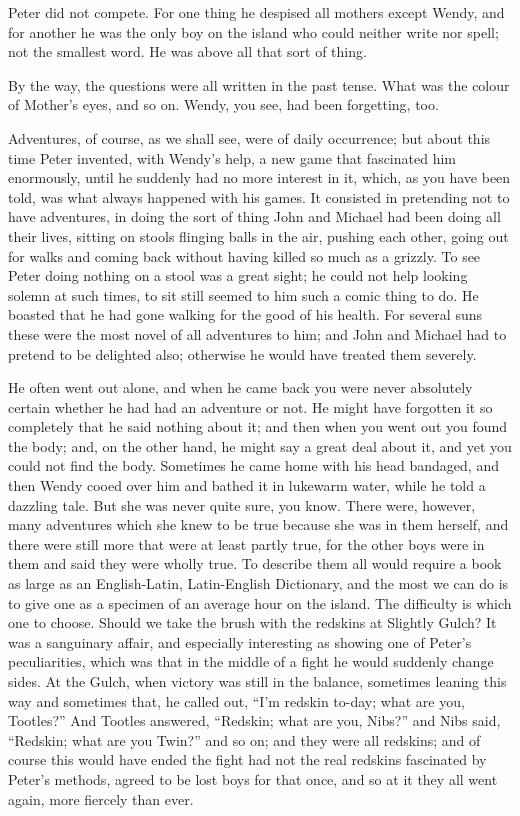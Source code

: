 Peter did not compete. For one thing he despised all mothers except
Wendy, and for another he was the only boy on the island who could
neither write nor spell; not the smallest word. He was above all that
sort of thing.

By the way, the questions were all written in the past tense. What was
the colour of Mother's eyes, and so on. Wendy, you see, had been
forgetting, too.

Adventures, of course, as we shall see, were of daily occurrence; but
about this time Peter invented, with Wendy's help, a new game that
fascinated him enormously, until he suddenly had no more interest in
it, which, as you have been told, was what always happened with his
games. It consisted in pretending not to have adventures, in doing the
sort of thing John and Michael had been doing all their lives, sitting
on stools flinging balls in the air, pushing each other, going out for
walks and coming back without having killed so much as a grizzly. To
see Peter doing nothing on a stool was a great sight; he could not help
looking solemn at such times, to sit still seemed to him such a comic
thing to do. He boasted that he had gone walking for the good of his
health. For several suns these were the most novel of all adventures to
him; and John and Michael had to pretend to be delighted also;
otherwise he would have treated them severely.

He often went out alone, and when he came back you were never
absolutely certain whether he had had an adventure or not. He might
have forgotten it so completely that he said nothing about it; and then
when you went out you found the body; and, on the other hand, he might
say a great deal about it, and yet you could not find the body.
Sometimes he came home with his head bandaged, and then Wendy cooed
over him and bathed it in lukewarm water, while he told a dazzling
tale. But she was never quite sure, you know. There were, however, many
adventures which she knew to be true because she was in them herself,
and there were still more that were at least partly true, for the other
boys were in them and said they were wholly true. To describe them all
would require a book as large as an English-Latin, Latin-English
Dictionary, and the most we can do is to give one as a specimen of an
average hour on the island. The difficulty is which one to choose.
Should we take the brush with the redskins at Slightly Gulch? It was a
sanguinary affair, and especially interesting as showing one of Peter's
peculiarities, which was that in the middle of a fight he would
suddenly change sides. At the Gulch, when victory was still in the
balance, sometimes leaning this way and sometimes that, he called out,
``I'm redskin to-day; what are you, Tootles?'' And Tootles answered,
``Redskin; what are you, Nibs?'' and Nibs said, ``Redskin; what are you
Twin?'' and so on; and they were all redskins; and of course this would
have ended the fight had not the real redskins fascinated by Peter's
methods, agreed to be lost boys for that once, and so at it they all
went again, more fiercely than ever.

